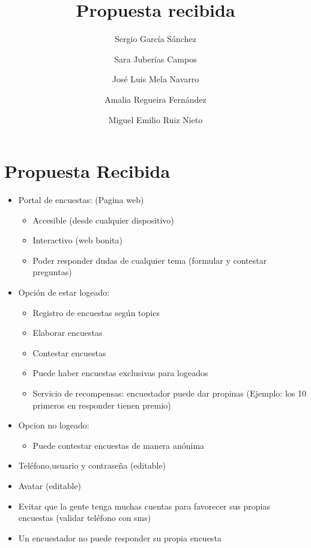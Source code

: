 \documentclass[a4paper,11pt]{report}
\begin{document}
\title{Propuesta recibida}
\author{
		Sergio García Sánchez
		\and
		Sara Juberías Campos
		\and
		José Luis Mela Navarro
		\and
		Amalia Regueira Fernández
		\and
		Miguel Emilio Ruiz Nieto
	}
\maketitle
\section*{Propuesta Recibida}
	\begin{itemize}
        \item Portal de encuestas: (Pagina web)
        \begin{itemize}
            \item Accesible (desde cualquier dispositivo)
            \item Interactivo (web bonita)
            \item Poder responder dudas de cualquier tema (formular y contestar
            preguntas)
        \end{itemize}
        \item Opción de estar logeado:
        \begin{itemize}
            \item Registro de encuestas según topics
            \item Elaborar encuestas
            \item Contestar encuestas
            \item Puede haber encuestas exclusivas para logeados
            \item Servicio de recompensas: encuestador puede dar propinas
            (Ejemplo: los 10 primeros en responder tienen premio)
        \end{itemize}
        \item Opcion no logeado:
        \begin{itemize}
            \item Puede contestar encuestas de manera anónima
        \end{itemize}
        \item Teléfono,usuario y contraseña (editable)
        \item Avatar (editable)
        \item Evitar que la gente tenga muchas cuentas para favorecer sus
        propias encuestas (validar teléfono con sms)
        \item Un encuestador no puede responder su propia encuesta

\end{itemize}
\end{document}
